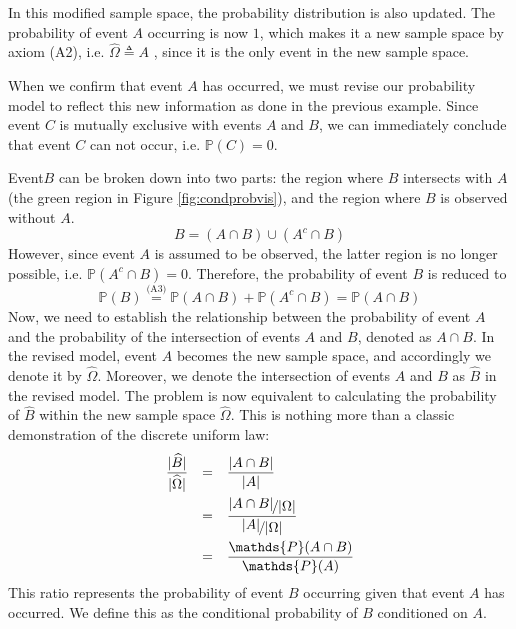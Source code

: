 In this modified sample space, the probability distribution is also updated. The probability of event $A$ occurring is now $1$, which makes it a new sample space by axiom (A2), i.e. $\widehat{\Omega}\triangleq A$ , since it is the only event in the new sample space.


When we confirm that event $A$ has occurred, we must revise our probability model to reflect this new information as done in the previous example. Since event $C$ is mutually exclusive with events $A$ and $B$, we can immediately conclude that event $C$ can not occur, i.e. $\mathds{P}(C)=0$.

Event$B$ can be broken down into two parts: the region where $B$ intersects with $A$ (the green region in Figure \cref{fig:condprobvis}), and the region where $B$ is observed without $A$.
\[
B=(A\cap B)\cup (A^{c}\cap B)
\]
However, since event $A$ is assumed to be observed, the latter region is no longer possible, i.e. $\mathds{P}(A^{c}\cap B)=0$. Therefore, the probability of event $B$ is reduced to
\[
\mathds{P}(B) \overset{\text{(A3)}}{=} \mathds{P}(A \cap B) + \mathds{P}(A^c \cap B) = \mathds{P}(A \cap B)
\]
Now, we need to establish the relationship between the probability of event $A$ and the probability of the intersection of events $A$ and $B$, denoted as $A \cap B$. In the revised model, event $A$ becomes the new sample space, and accordingly we denote it by $\widehat{\Omega}$. Moreover, we denote the intersection of events $A$ and $B$ as $\widehat{B}$ in the revised model. The problem is now equivalent to calculating the probability of $\widehat{B}$ within the new sample space $\widehat{\Omega}$. This is nothing more than a classic demonstration of the discrete uniform law:
\[
\begin{array}{ccl}
\dis\frac{|\widehat{B}|}{|\widehat{\Omega}|} & = & \dis\frac{|A \cap B|}{|A|} \\[0.4cm]
& = & \dis\frac{\dis\nicefrac{\dis|A \cap B|}{\dis|\Omega|}}{\dis\nicefrac{\dis|A|}{\dis|\Omega|}} \\[0.4cm]
& = & \dis\frac{\mathds{P}(A \cap B)}{\mathds{P}(A)}
\end{array}
\]
This ratio represents the probability of event $B$ occurring given that event $A$ has occurred. We define this as the conditional probability of $B$ conditioned on $A$.

